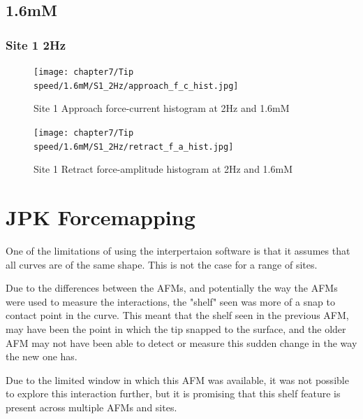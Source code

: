 \subsection*{1.6mM}
\subsubsection*{Site 1 2Hz}
\begin{figure}[h!]
\centering
\texttt{[image: chapter7/Tip speed/1.6mM/S1\_2Hz/approach\_f\_c\_hist.jpg]}
\caption{Site 1 Approach force-current histogram at 2Hz and 1.6mM}
\end{figure}

\begin{figure}[h!]
\centering
\texttt{[image: chapter7/Tip speed/1.6mM/S1\_2Hz/retract\_f\_a\_hist.jpg]}
\caption{Site 1 Retract force-amplitude histogram at 2Hz and 1.6mM}
\end{figure}


\section{JPK Forcemapping}

One of the limitations of using the interpertaion software is that it assumes that all curves are of the same shape. This is not the case for a range of sites.

Due to the differences between the AFMs, and potentially the way the AFMs were used to measure the interactions, the "shelf" seen was more of a snap to contact point in the curve. This meant that the shelf seen in the previous AFM, may have been the point in which the tip snapped to the surface, and the older AFM may not have been able to detect or measure this sudden change in the way the new one has. 

Due to the limited window in which this AFM was available, it was not possible to explore this interaction further, but it is promising that this shelf feature is present across multiple AFMs and sites.